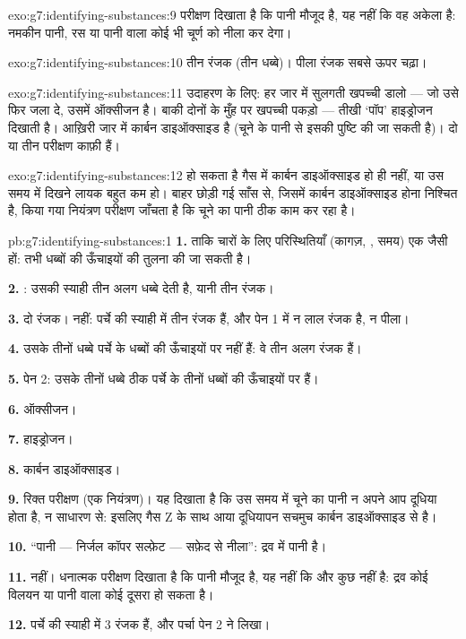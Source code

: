 \begin{solution}{exo:g7:identifying-substances:9}
परीक्षण दिखाता है कि पानी मौजूद है, यह नहीं कि वह अकेला है: नमकीन पानी,
रस या पानी वाला कोई भी  चूर्ण को नीला कर देगा।
\end{solution}

\begin{solution}{exo:g7:identifying-substances:10}
तीन रंजक (तीन धब्बे)। पीला रंजक सबसे ऊपर चढ़ा।
\end{solution}

\begin{solution}{exo:g7:identifying-substances:11}
उदाहरण के लिए: हर जार में सुलगती खपच्ची डालो --- जो उसे फिर जला दे, उसमें
ऑक्सीजन है। बाकी दोनों के मुँह पर  खपच्ची पकड़ो --- तीखी `पॉप'
हाइड्रोजन दिखाती है। आख़िरी जार में कार्बन डाइऑक्साइड है (चूने के पानी से इसकी
पुष्टि की जा सकती है)। दो या तीन परीक्षण काफ़ी हैं।
\end{solution}

\begin{solution}{exo:g7:identifying-substances:12}
हो सकता है गैस में कार्बन डाइऑक्साइड हो ही नहीं, या उस समय में दिखने लायक
बहुत कम हो। बाहर छोड़ी गई साँस से, जिसमें कार्बन डाइऑक्साइड होना निश्चित है,
किया गया नियंत्रण परीक्षण जाँचता है कि चूने का पानी ठीक काम कर रहा है।
\end{solution}

\begin{solution}{pb:g7:identifying-substances:1}
\textbf{1.} ताकि चारों के लिए परिस्थितियाँ (कागज़, , समय) एक जैसी
हों: तभी धब्बों की ऊँचाइयों की तुलना की जा सकती है।

\textbf{2.} : उसकी स्याही तीन अलग धब्बे देती है, यानी तीन रंजक।

\textbf{3.} दो रंजक। नहीं: पर्चे की स्याही में तीन रंजक हैं, और पेन 1 में
न लाल रंजक है, न पीला।

\textbf{4.} उसके तीनों धब्बे पर्चे के धब्बों की ऊँचाइयों पर नहीं हैं: वे
तीन अलग रंजक हैं।

\textbf{5.} पेन 2: उसके तीनों धब्बे ठीक पर्चे के तीनों धब्बों की
ऊँचाइयों पर हैं।

\textbf{6.} ऑक्सीजन।

\textbf{7.} हाइड्रोजन।

\textbf{8.} कार्बन डाइऑक्साइड।

\textbf{9.} रिक्त परीक्षण (एक नियंत्रण)। यह दिखाता है कि उस समय में चूने का
पानी न अपने आप दूधिया होता है, न साधारण  से: इसलिए गैस Z के साथ आया
दूधियापन सचमुच कार्बन डाइऑक्साइड से है।

\textbf{10.} ``पानी --- निर्जल कॉपर सल्फ़ेट --- सफ़ेद से नीला'':
द्रव में पानी है।

\textbf{11.} नहीं। धनात्मक परीक्षण दिखाता है कि पानी मौजूद है, यह नहीं कि और
कुछ नहीं है: द्रव कोई विलयन या पानी वाला कोई दूसरा 
हो सकता है।

\textbf{12.} पर्चे की स्याही में 3 रंजक हैं, और पर्चा पेन 2 ने
लिखा।
\end{solution}
